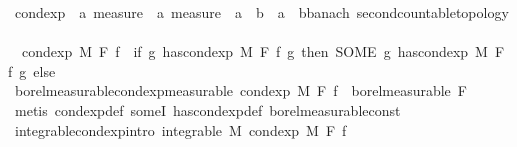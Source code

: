 \begin{isabellebody}
\isanewline
{}\isamarkupfalse%
\ cond{\isacharunderscore}{\kern0pt}exp\ {\isacharcolon}{\kern0pt}{\isacharcolon}{\kern0pt}\ {\isachardoublequoteopen}{\isacharprime}{\kern0pt}a\ measure\ {\isasymRightarrow}\ {\isacharprime}{\kern0pt}a\ measure\ {\isasymRightarrow}\ {\isacharparenleft}{\kern0pt}{\isacharprime}{\kern0pt}a\ {\isasymRightarrow}\ {\isacharprime}{\kern0pt}b{\isacharparenright}{\kern0pt}\ {\isasymRightarrow}\ {\isacharparenleft}{\kern0pt}{\isacharprime}{\kern0pt}a\ {\isasymRightarrow}\ {\isacharprime}{\kern0pt}b{\isacharcolon}{\kern0pt}{\isacharcolon}{\kern0pt}{\isacharbraceleft}{\kern0pt}banach{\isacharcomma}{\kern0pt}\ second{\isacharunderscore}{\kern0pt}countable{\isacharunderscore}{\kern0pt}topology{\isacharbraceright}{\kern0pt}{\isacharparenright}{\kern0pt}{\isachardoublequoteclose}\ \isanewline
\ \ {\isachardoublequoteopen}cond{\isacharunderscore}{\kern0pt}exp\ M\ F\ f\ {\isacharequal}{\kern0pt}\ {\isacharparenleft}{\kern0pt}if\ {\isasymexists}g{\isachardot}{\kern0pt}\ has{\isacharunderscore}{\kern0pt}cond{\isacharunderscore}{\kern0pt}exp\ M\ F\ f\ g\ then\ {\isacharparenleft}{\kern0pt}SOME\ g{\isachardot}{\kern0pt}\ has{\isacharunderscore}{\kern0pt}cond{\isacharunderscore}{\kern0pt}exp\ M\ F\ f\ g{\isacharparenright}{\kern0pt}\ else\ {\isacharparenleft}{\kern0pt}{\isasymlambda}{\isacharunderscore}{\kern0pt}{\isachardot}{\kern0pt}\ {}{\isacharparenright}{\kern0pt}{\isacharparenright}{\kern0pt}{\isachardoublequoteclose}\isanewline
\isanewline
{}\isamarkupfalse%
\ borel{\isacharunderscore}{\kern0pt}measurable{\isacharunderscore}{\kern0pt}cond{\isacharunderscore}{\kern0pt}exp{\isacharbrackleft}{\kern0pt}measurable{\isacharbrackright}{\kern0pt}{\isacharcolon}{\kern0pt}\ {\isachardoublequoteopen}cond{\isacharunderscore}{\kern0pt}exp\ M\ F\ f\ {\isasymin}\ borel{\isacharunderscore}{\kern0pt}measurable\ F{\isachardoublequoteclose}\ \isanewline
%
\isadelimproof
\ \ %
\endisadelimproof
%
\isatagproof
{}\isamarkupfalse%
\ {\isacharparenleft}{\kern0pt}metis\ cond{\isacharunderscore}{\kern0pt}exp{\isacharunderscore}{\kern0pt}def\ someI\ has{\isacharunderscore}{\kern0pt}cond{\isacharunderscore}{\kern0pt}exp{\isacharunderscore}{\kern0pt}def\ borel{\isacharunderscore}{\kern0pt}measurable{\isacharunderscore}{\kern0pt}const{\isacharparenright}{\kern0pt}%
\endisatagproof
{\isafoldproof}%
%
\isadelimproof
\isanewline
%
\endisadelimproof
\isanewline
{}\isamarkupfalse%
\ integrable{\isacharunderscore}{\kern0pt}cond{\isacharunderscore}{\kern0pt}exp{\isacharbrackleft}{\kern0pt}intro{\isacharbrackright}{\kern0pt}{\isacharcolon}{\kern0pt}\ {\isachardoublequoteopen}integrable\ M\ {\isacharparenleft}{\kern0pt}cond{\isacharunderscore}{\kern0pt}exp\ M\ F\ f{\isacharparenright}{\kern0pt}{\isachardoublequoteclose}\ \isanewline

\end{isabellebody}

